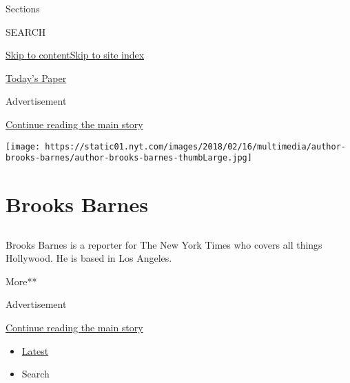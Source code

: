 Sections

SEARCH

\protect\hyperlink{site-content}{Skip to
content}\protect\hyperlink{site-index}{Skip to site index}

\href{https://myaccount.nytimes.com/auth/login?response_type=cookie\&client_id=vi}{}

\href{https://www.nytimes.com/section/todayspaper}{Today's Paper}

Advertisement

\protect\hyperlink{after-top}{Continue reading the main story}

\texttt{[image: https://static01.nyt.com/images/2018/02/16/multimedia/author-brooks-barnes/author-brooks-barnes-thumbLarge.jpg]}

\hypertarget{brooks-barnes}{%
\section{Brooks Barnes}\label{brooks-barnes}}

\subsection{}

Brooks Barnes is a reporter for The New York Times who covers all things
Hollywood. He is based in Los Angeles.

More**

Advertisement

\protect\hyperlink{after-mid1}{Continue reading the main story}

\begin{itemize}
\tightlist
\item
  \protect\hyperlink{stream-panel}{Latest}
\item
  Search
\end{itemize}

